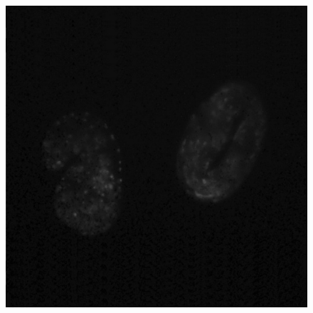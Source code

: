 \documentclass[10pt, journal, letterpaper, onecolumn, draftcls]{IEEEtran}
\begin{document}
\begin{figure}[!t]
{		\includegraphics[width=\myWidth\columnwidth]{figures/cell_database_gray/3gray.jpg}
		\label{fig:3gray}
	}
\end{figure}
\end{document}
